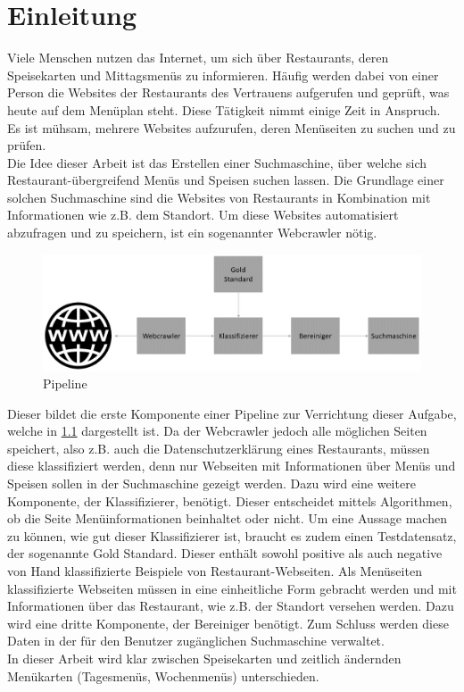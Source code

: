\chapter{Einleitung}
Viele Menschen nutzen das Internet, um sich über Restaurants, deren Speisekarten und Mittagsmenüs zu informieren.
Häufig werden dabei von einer Person die Websites der Restaurants des Vertrauens aufgerufen und geprüft, was heute auf dem Menüplan steht.
Diese Tätigkeit nimmt einige Zeit in Anspruch.
Es ist mühsam, mehrere Websites aufzurufen, deren Menüseiten zu suchen und zu prüfen.\\
Die Idee dieser Arbeit ist das Erstellen einer Suchmaschine, über welche sich Restaurant-übergreifend Menüs und Speisen suchen lassen.
Die Grundlage einer solchen Suchmaschine sind die Websites von Restaurants in Kombination mit Informationen wie z.B. dem Standort.
Um diese Websites automatisiert abzufragen und zu speichern, ist ein sogenannter Webcrawler nötig.
\begin{figure}[H]	
	\includegraphics[width=1\columnwidth,keepaspectratio]{img/Ablauf_Einleitung.png}
	\caption{Pipeline}
	\label{fig:ablauf_einleitung}
\end{figure}
Dieser bildet die erste Komponente einer Pipeline zur Verrichtung dieser Aufgabe, welche in \cref{fig:ablauf_einleitung} dargestellt ist.
Da der Webcrawler jedoch alle möglichen Seiten speichert, also z.B. auch die Datenschutzerklärung eines Restaurants, müssen diese klassifiziert werden, denn nur Webseiten mit Informationen über Menüs und Speisen sollen in der Suchmaschine gezeigt werden.
Dazu wird eine weitere Komponente, der Klassifizierer, benötigt.
Dieser entscheidet mittels Algorithmen, ob die Seite Menüinformationen beinhaltet oder nicht.
Um eine Aussage machen zu können, wie gut dieser Klassifizierer ist, braucht es zudem einen Testdatensatz, der sogenannte Gold Standard.
Dieser enthält sowohl positive als auch negative von Hand klassifizierte Beispiele von Restaurant-Webseiten.
Als Menüseiten klassifizierte Webseiten müssen in eine einheitliche Form gebracht werden und mit Informationen über das Restaurant, wie z.B. der Standort versehen werden.
Dazu wird eine dritte Komponente, der Bereiniger benötigt.
Zum Schluss werden diese Daten in der für den Benutzer zugänglichen Suchmaschine verwaltet.\\
In dieser Arbeit wird klar zwischen Speisekarten und zeitlich ändernden Menükarten (Tagesmenüs, Wochenmenüs) unterschieden.   
